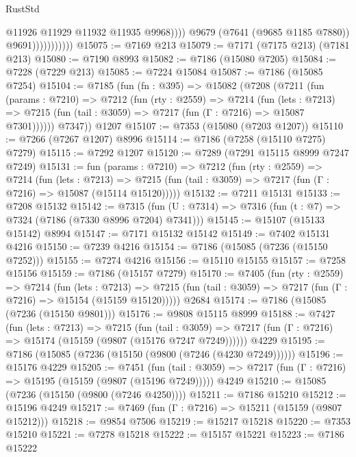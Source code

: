 \begin{lexlean}{RustStd}
\begin{coremodule}
                                  @11926
                                  @11929
                                  @11932
                                  @11935
                                  @9968))))
                          @9679
                          (@7641 (@9685 @1185 @7880))
                          @9691)))))))))))
@15075 := @7169 @213
@15079 := @7171 (@7175 @213) (@7181 @213)
@15080 := @7190 @8993
@15082 := @7186 (@15080 @7205)
@15084 := @7228 (@7229 @213)
@15085 := @7224 @15084
@15087 := @7186 (@15085 @7254)
@15104 := @7185
    (fun (fn : @395) =>
    @15082
      (@7208
        (@7211
          (fun (params : @7210) =>
          @7212
            (fun (rty : @2559) =>
            @7214
              (fun (lets : @7213) =>
              @7215 (fun (tail : @3059) => @7217 (fun (Γ : @7216) => @15087 @7301))))))
        @7347))
    @1207
@15107 := @7353 (@15080 (@7203 @1207))
@15110 := @7266 (@7267 @1207) @8996
@15114 := @7186 (@7258 (@15110 @7275) @7279)
@15115 := @7292 @1207
@15120 := @7289 (@7291 @15115 @8999 @7247 @7249)
@15131 := fun (params : @7210) =>
  @7212
    (fun (rty : @2559) =>
    @7214
      (fun (lets : @7213) =>
      @7215 (fun (tail : @3059) => @7217 (fun (Γ : @7216) => @15087 (@15114 @15120)))))
@15132 := @7211 @15131
@15133 := @7208 @15132
@15142 := @7315 (fun (U : @7314) => @7316 (fun (t : @7) => @7324 (@7186 (@7330 @8996 @7204) @7341)))
@15145 := @15107 (@15133 @15142) @8994
@15147 := @7171 @15132 @15142
@15149 := @7402 @15131 @4216
@15150 := @7239 @4216
@15154 := @7186 (@15085 (@7236 (@15150 @7252)))
@15155 := @7274 @4216
@15156 := @15110 @15155
@15157 := @7258 @15156
@15159 := @7186 (@15157 @7279)
@15170 := @7405
    (fun (rty : @2559) =>
    @7214
      (fun (lets : @7213) =>
      @7215 (fun (tail : @3059) => @7217 (fun (Γ : @7216) => @15154 (@15159 @15120)))))
    @2684
@15174 := @7186 (@15085 (@7236 (@15150 @9801)))
@15176 := @9808 @15115 @8999
@15188 := @7427
    (fun (lets : @7213) =>
    @7215
      (fun (tail : @3059) =>
      @7217 (fun (Γ : @7216) => @15174 (@15159 (@9807 (@15176 @7247 @7249))))))
    @4229
@15195 := @7186 (@15085 (@7236 (@15150 (@9800 (@7246 (@4230 @7249))))))
@15196 := @15176 @4229
@15205 := @7451
    (fun (tail : @3059) => @7217 (fun (Γ : @7216) => @15195 (@15159 (@9807 (@15196 @7249)))))
    @4249
@15210 := @15085 (@7236 (@15150 (@9800 (@7246 @4250))))
@15211 := @7186 @15210
@15212 := @15196 @4249
@15217 := @7469 (fun (Γ : @7216) => @15211 (@15159 (@9807 @15212)))
@15218 := @9854 @7506
@15219 := @15217 @15218
@15220 := @7353 @15210
@15221 := @7278 @15218
@15222 := @15157 @15221
@15223 := @7186 @15222

\end{coremodule}
\end{lexlean}
